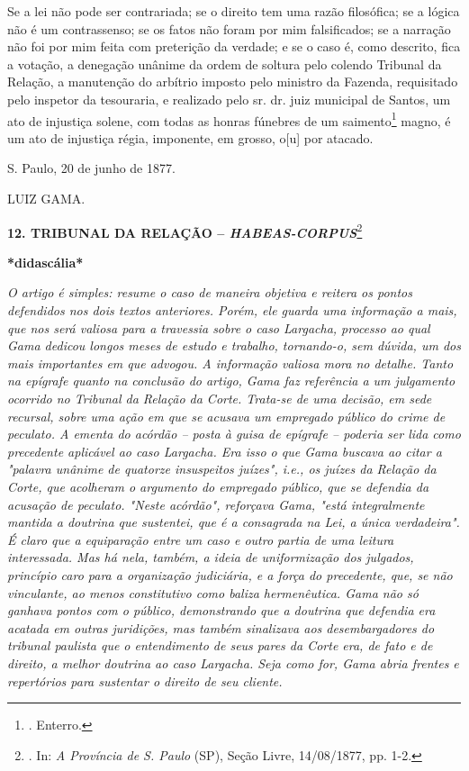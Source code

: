 Se a lei não pode ser contrariada; se o direito tem uma razão
filosófica; se a lógica não é um contrassenso; se os fatos não foram por
mim falsificados; se a narração não foi por mim feita com preterição da
verdade; e se o caso é, como descrito, fica a votação, a denegação
unânime da ordem de soltura pelo colendo Tribunal da Relação, a
manutenção do arbítrio imposto pelo ministro da Fazenda, requisitado
pelo inspetor da tesouraria, e realizado pelo sr. dr. juiz municipal de
Santos, um ato de injustiça solene, com todas as honras fúnebres de um
saimento\footnote{. Enterro.}
magn\protect\hypertarget{Secao_Sem_Titulo-17}{}{}o, é um ato de
injustiça régia, imponente, em grosso, o{[}u{]} por atacado.

S. Paulo, 20 de junho de 1877.

LUIZ GAMA.

\textbf{12. TRIBUNAL DA RELAÇÃO -- \emph{HABEAS-CORPUS}}\footnote{. In:
  \emph{A Província de S. Paulo} (SP), Seção Livre, 14/08/1877, pp. 1-2.}

\textbf{*didascália*}

\emph{O artigo é simples: resume o caso de maneira objetiva e reitera os
pontos defendidos nos dois textos anteriores. Porém, ele guarda uma
informação a mais, que nos será valiosa para a travessia sobre o caso
Largacha, processo ao qual Gama dedicou longos meses de estudo e
trabalho, tornando-o, sem dúvida, um dos mais importantes em que
advogou. A informação valiosa mora no detalhe. Tanto na epígrafe quanto
na conclusão do artigo, Gama faz referência a um julgamento ocorrido no
Tribunal da Relação da Corte. Trata-se de uma decisão, em sede recursal,
sobre uma ação em que se acusava um empregado público do crime de
peculato. A ementa do acórdão -- posta à guisa de epígrafe -- poderia
ser lida como precedente aplicável ao caso Largacha. Era isso o que Gama
buscava ao citar a "palavra unânime de quatorze insuspeitos juízes",
i.e., os juízes da Relação da Corte, que acolheram o argumento do
empregado público, que se defendia da acusação de peculato. "Neste
acórdão", reforçava Gama, "está integralmente mantida a doutrina que
sustentei, que é a consagrada na Lei, a única verdadeira". É claro que a
equiparação entre um caso e outro partia de uma leitura interessada. Mas
há nela, também, a ideia de uniformização dos julgados, princípio caro
para a organização judiciária, e a força do precedente, que, se não
vinculante, ao menos constitutivo como baliza hermenêutica. Gama não só
ganhava pontos com o público, demonstrando que a doutrina que defendia
era acatada em outras juridições, mas também sinalizava aos
desembargadores do tribunal paulista que o entendimento de seus pares da
Corte era, de fato e de direito, a melhor doutrina ao caso Largacha.
Seja como for, Gama abria frentes e repertórios para sustentar o direito
de seu cliente. }

